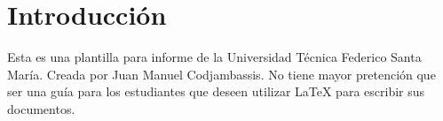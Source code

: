 \section{Introducción}

Esta es una plantilla para informe de la Universidad Técnica Federico Santa María. Creada por Juan Manuel Codjambassis. No tiene mayor pretención que ser una guía para los estudiantes que deseen utilizar \LaTeX{} para escribir sus documentos.